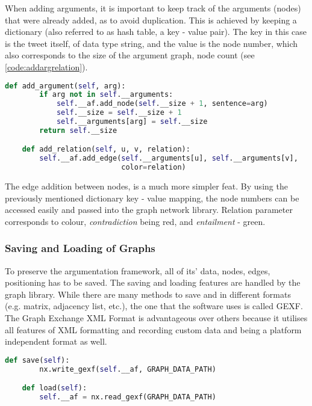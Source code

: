             When adding arguments, it is important to keep track of the arguments (nodes) that were already added, as to avoid duplication. This is achieved by keeping a dictionary (also referred to as hash table, a key - value pair). The key in this case is the tweet itself, of data type string, and the value is the node number, which also corresponds to the size of the argument graph, node count (see \cref{code:addargrelation}).
            
            \begin{lstlisting}[language=Python, caption=Adding Arguments and Relations, label=code:addargrelation]
    def add_argument(self, arg):
        if arg not in self.__arguments:
            self.__af.add_node(self.__size + 1, sentence=arg)
            self.__size = self.__size + 1
            self.__arguments[arg] = self.__size
        return self.__size

    def add_relation(self, u, v, relation):
        self.__af.add_edge(self.__arguments[u], self.__arguments[v], 
                           color=relation)
            \end{lstlisting}
            
            The edge addition between nodes, is a much more simpler feat. By using the previously mentioned dictionary key - value mapping, the node numbers can be accessed easily and passed into the graph network library. Relation parameter corresponds to colour, \textit{contradiction} being red, and \textit{entailment} - green.
            
            \subsubsection{Saving and Loading of Graphs}
            
                To preserve the argumentation framework, all of its' data, nodes, edges, positioning has to be saved. The saving and loading features are handled by the graph library. While there are many methods to save and in different formats (e.g. matrix, adjacency list, etc.), the one that the software uses is called GEXF. The Graph Exchange XML Format is advantageous over others because it utilises all features of XML formatting and recording custom data and being a platform independent format as well.
            
                \begin{lstlisting}[language=Python, caption=Saving and Loading Argument Frameworks, label=code:afsaveload]
    def save(self):
        nx.write_gexf(self.__af, GRAPH_DATA_PATH)

    def load(self):
        self.__af = nx.read_gexf(GRAPH_DATA_PATH)
                \end{lstlisting}
    
